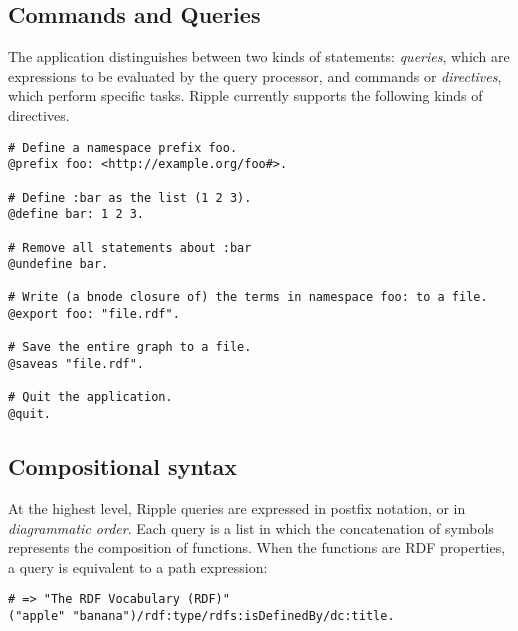 \documentclass[runningheads]{llncs}
\begin{document}
\subsection{Commands and Queries}
The application distinguishes between two kinds of statements: \textit{queries}, which are expressions to be evaluated by the query processor, and commands or \textit{directives}, which perform specific tasks.  Ripple currently supports the following kinds of directives.
\newline
\begin{verbatim}
# Define a namespace prefix foo.
@prefix foo: <http://example.org/foo#>.

# Define :bar as the list (1 2 3).
@define bar: 1 2 3.

# Remove all statements about :bar
@undefine bar.

# Write (a bnode closure of) the terms in namespace foo: to a file.
@export foo: "file.rdf".

# Save the entire graph to a file.
@saveas "file.rdf".

# Quit the application.
@quit.
\end{verbatim}


\subsection{Compositional syntax}

At the highest level, Ripple queries are expressed in postfix notation, or in \textit{diagrammatic order}.  Each query is a list in which the concatenation of symbols represents the composition of functions.  When the functions are RDF properties, a query is equivalent to a path expression:

\begin{verbatim}
# => "The RDF Vocabulary (RDF)"
("apple" "banana")/rdf:type/rdfs:isDefinedBy/dc:title.
\end{verbatim}
\end{document}
